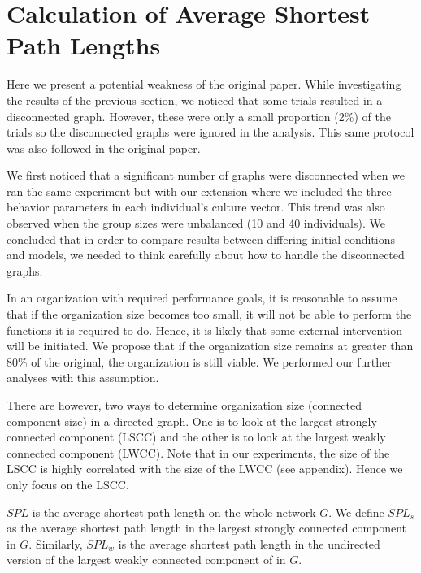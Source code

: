 \newpage
\section{Calculation of Average Shortest Path Lengths}\label{sec:discrep}

Here we present a potential weakness of the original paper.
While investigating the results of the previous section, we
noticed that some trials resulted in a disconnected graph.
However, these were only a small proportion (2\%) of the trials
so the disconnected graphs were ignored in the analysis.
This same protocol was also followed in the original paper.

We first noticed that a significant number of graphs were
disconnected when we ran the same experiment but with our extension
where we included the three behavior parameters in each individual's
culture vector.
This trend was also observed when the group sizes were unbalanced
(10 and 40 individuals).
We concluded that in order to compare results between differing
initial conditions and models, we needed to think carefully
about how to handle
the disconnected graphs.

In an organization with required performance goals, it is reasonable
to assume that if the organization size becomes too small,
it will not be able to perform the functions it is required to do.
Hence, it is likely that some external intervention will be initiated.
We propose that if the organization size remains at greater than 80\%
of the original, the organization is still viable.
We performed our further analyses with this assumption.

There are however, two ways to determine organization size
(connected component size) in a directed graph.
One is to look at the largest strongly connected component (LSCC) and the other
is to look at the largest weakly connected component (LWCC).
Note that in our experiments,
the size of the LSCC is highly correlated with the size of the LWCC (see appendix). Hence we only focus on the LSCC.

\begin{defn}
    $SPL$ is the average shortest path length on the whole network $G$.
    We define $SPL_s$
    as the average shortest path length in the largest strongly connected component in $G$. Similarly, $SPL_w$ is the average shortest path length in the undirected version of the largest weakly connected component of in $G$.
\end{defn}

